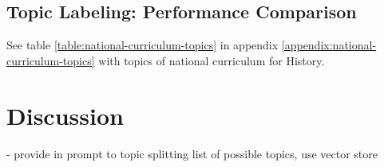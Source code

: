 \documentclass[]{interact}
\theoremstyle{plain}%
\theoremstyle{definition}
\theoremstyle{remark}
\begin{document}


\subsection{Topic Labeling: Performance Comparison}

See table \ref{table:national-curriculum-topics} in appendix \ref{appendix:national-curriculum-topics} with topics of national curriculum for History.




\section{Discussion}




- provide in prompt to topic splitting list of possible topics, use vector store

\end{document}

